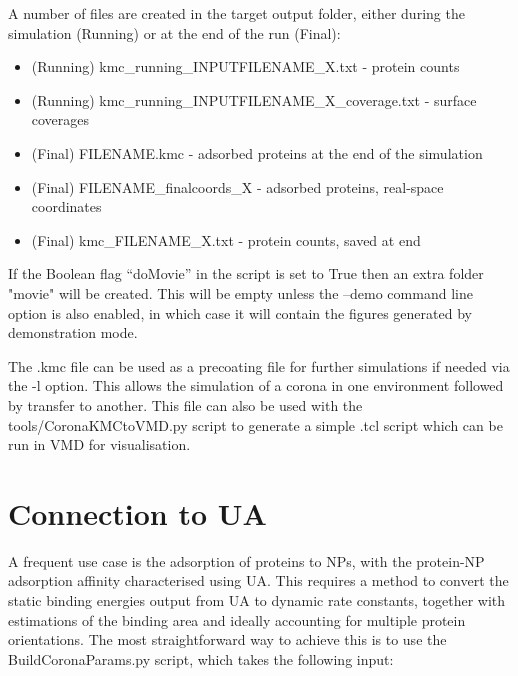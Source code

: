 \documentclass[10pt,a4paper,onecolumn]{report}
\begin{document}
A number of files are created in the target output folder, either during the simulation (Running) or at the end of the run (Final):
\begin{itemize}
\item (Running) kmc\_running\_INPUTFILENAME\_X.txt - protein counts
\item (Running) kmc\_running\_INPUTFILENAME\_X\_coverage.txt - surface coverages
\item (Final) FILENAME.kmc - adsorbed proteins at the end of the simulation
\item (Final) FILENAME\_finalcoords\_X - adsorbed proteins, real-space coordinates
\item (Final) kmc\_FILENAME\_X.txt - protein counts, saved at end
\end{itemize}

If the Boolean flag ``doMovie'' in the script is set to True then an extra folder "movie" will be created. This will be empty unless the --demo command line option is also enabled, in which case it will contain the figures generated by demonstration mode.

The .kmc file can be used as a precoating file for further simulations if needed via the -l option. This allows the simulation of a corona in one environment followed by transfer to another.  This file can also be used with the tools/CoronaKMCtoVMD.py script to generate a simple .tcl script which can be run in VMD for visualisation.


\section{Connection to UA}
A frequent use case is the adsorption of proteins to NPs, with the protein-NP adsorption affinity characterised using UA. This requires a method to convert the static binding energies output from UA to dynamic rate constants, together with estimations of the binding area and ideally accounting for multiple protein orientations. The most straightforward way to achieve this is to use the BuildCoronaParams.py script, which takes the following input:
\end{document}
